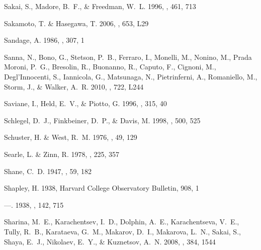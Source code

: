 \documentclass[manuscript]{aastex}
\begin{document}
\begin{thebibliography}{381}
{Sakai}, S., {Madore}, B.~F., \& {Freedman}, W.~L. 1996, \apj, 461, 713

{Sakamoto}, T. \& {Hasegawa}, T. 2006, \apjl, 653, L29

{Sandage}, A. 1986, \apj, 307, 1

{Sanna}, N., {Bono}, G., {Stetson}, P.~B., {Ferraro}, I., {Monelli}, M.,
  {Nonino}, M., {Prada Moroni}, P.~G., {Bresolin}, R., {Buonanno}, R.,
  {Caputo}, F., {Cignoni}, M., {Degl'Innocenti}, S., {Iannicola}, G.,
  {Matsunaga}, N., {Pietrinferni}, A., {Romaniello}, M., {Storm}, J., \&
  {Walker}, A.~R. 2010, \apjl, 722, L244

{Saviane}, I., {Held}, E.~V., \& {Piotto}, G. 1996, \aap, 315, 40

{Schlegel}, D.~J., {Finkbeiner}, D.~P., \& {Davis}, M. 1998, \apj, 500, 525

{Schuster}, H. \& {West}, R.~M. 1976, \aap, 49, 129

{Searle}, L. \& {Zinn}, R. 1978, \apj, 225, 357

{Shane}, C.~D. 1947, \pasp, 59, 182

{Shapley}, H. 1938{}, Harvard College Observatory Bulletin, 908, 1

---. 1938{}, \nat, 142, 715

{Sharina}, M.~E., {Karachentsev}, I.~D., {Dolphin}, A.~E., {Karachentseva},
  V.~E., {Tully}, R.~B., {Karataeva}, G.~M., {Makarov}, D.~I., {Makarova},
  L.~N., {Sakai}, S., {Shaya}, E.~J., {Nikolaev}, E.~Y., \& {Kuznetsov}, A.~N.
  2008, \mnras, 384, 1544


\end{thebibliography}
\end{document}
